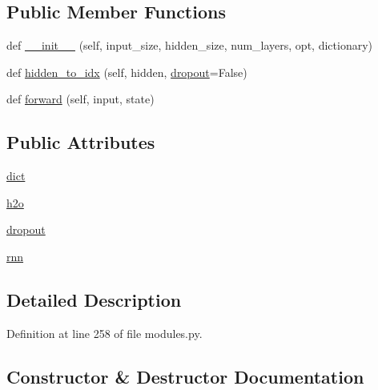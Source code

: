\subsection*{Public Member Functions}
\begin{DoxyCompactItemize}
\item 
def \hyperlink{classprojects_1_1memnn__feedback_1_1agent_1_1modules_1_1Decoder_a20c4d7bd66706996d3b34d7cbc68e2ec}{\+\_\+\+\_\+init\+\_\+\+\_\+} (self, input\+\_\+size, hidden\+\_\+size, num\+\_\+layers, opt, dictionary)
\item 
def \hyperlink{classprojects_1_1memnn__feedback_1_1agent_1_1modules_1_1Decoder_a3f1f3b7a66bff23cd1923ff739c42456}{hidden\+\_\+to\+\_\+idx} (self, hidden, \hyperlink{classprojects_1_1memnn__feedback_1_1agent_1_1modules_1_1Decoder_a1f90b65a911c97661bc4b9c0e6d0d74e}{dropout}=False)
\item 
def \hyperlink{classprojects_1_1memnn__feedback_1_1agent_1_1modules_1_1Decoder_afea4d72e2b956ae9c2f896a6f2bf2ff2}{forward} (self, input, state)
\end{DoxyCompactItemize}
\subsection*{Public Attributes}
\begin{DoxyCompactItemize}
\item 
\hyperlink{classprojects_1_1memnn__feedback_1_1agent_1_1modules_1_1Decoder_a26b383c0d9f0e2088f5a1731683e5d7e}{dict}
\item 
\hyperlink{classprojects_1_1memnn__feedback_1_1agent_1_1modules_1_1Decoder_a2944c1214ef4b408e0c0e7b2387a2fee}{h2o}
\item 
\hyperlink{classprojects_1_1memnn__feedback_1_1agent_1_1modules_1_1Decoder_a1f90b65a911c97661bc4b9c0e6d0d74e}{dropout}
\item 
\hyperlink{classprojects_1_1memnn__feedback_1_1agent_1_1modules_1_1Decoder_a7cd6616d295ec8fc3ab0c837e651f402}{rnn}
\end{DoxyCompactItemize}


\subsection{Detailed Description}


Definition at line 258 of file modules.\+py.



\subsection{Constructor \& Destructor Documentation}
\mbox{\label{classprojects_1_1memnn__feedback_1_1agent_1_1modules_1_1Decoder_a20c4d7bd66706996d3b34d7cbc68e2ec}} 

